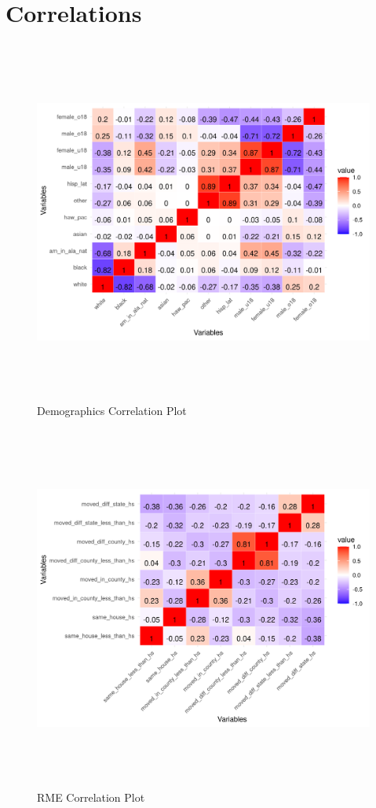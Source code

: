 \chapter{Correlations}
\begin{figure}[htbp]
    \centering
     \includegraphics[width=1\textwidth, height=12cm]{plots/correlations/dem_prob_corr.png}
     \caption{Demographics Correlation Plot}
 \end{figure}

 \begin{figure}[htbp]
    \centering
     \includegraphics[width=1\textwidth, height=12cm]{plots/correlations/RME_prob_corr.png}
     \caption{RME Correlation Plot}
 \end{figure}

